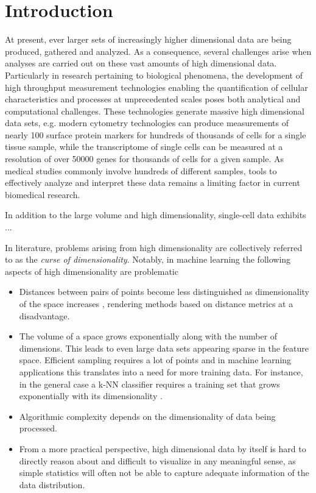 \chapter{Introduction}
\label{ch:introduction}

At present, ever larger sets of increasingly higher dimensional data are being produced, gathered and analyzed. As a consequence, several challenges arise when analyses are carried out on these vast amounts of high dimensional data. Particularly in research pertaining to biological phenomena, the development of high throughput measurement technologies enabling the quantification of cellular characteristics and processes at unprecedented scales poses both analytical and computational challenges. These technologies generate massive high dimensional data sets, e.g. modern cytometry technologies can produce measurements of nearly 100 surface protein markers for hundreds of thousands of cells for a single tissue sample, while the transcriptome of single cells can be measured at a resolution of over 50000 genes for thousands of cells for a given sample. As medical studies commonly involve hundreds of different samples, tools to effectively analyze and interpret these data remains a limiting factor in current biomedical research.

In addition to the large volume and high dimensionality, single-cell data exhibits ... 

In literature, problems arising from high dimensionality are collectively referred to as the \textit{curse of dimensionality}. Notably, in machine learning the following aspects of high dimensionality are problematic

\begin{itemize}
\item Distances between pairs of points become less distinguished as dimensionality of the space increases \cite{on_the_surprising_behavior_of_distance_metrics}, rendering methods based on distance metrics at a disadvantage.
\item The volume of a space grows exponentially along with the number of dimensions. This leads to even large data sets appearing sparse in the feature space. Efficient sampling requires a lot of points and in machine learning applications this translates into a need for more training data. For instance, in the general case a k-NN classifier requires a training set that grows exponentially with its dimensionality \cite[p.~263]{understanding_machine_learning}.
\item Algorithmic complexity depends on the dimensionality of data being processed.
\item From a more practical perspective, high dimensional data by itself is hard to directly reason about and difficult to visualize in any meaningful sense, as simple statistics will often not be able to capture adequate information of the data distribution.
\end{itemize}

